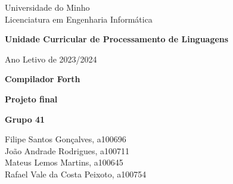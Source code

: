 \documentclass{article}
\begin{document}
\begin{titlepage}
    \centering
    
    {\small Universidade do Minho \\
    Licenciatura em Engenharia Informática \par}
    
    \vspace*{\fill} %

    {\huge\bfseries Unidade Curricular de Processamento de Linguagens \par}
    
    \vspace{0.5cm} %
    
    {\normalsize Ano Letivo de 2023/2024 \par}
    
    \vspace{1cm} %
    
    \hrulefill %
    
    \vspace{1cm} %
    
    {\huge\bfseries Compilador Forth \par}
    
    \vspace{0.5cm} %

    
    {\large\bfseries Projeto final \par}

    \vspace{1cm} %
    
    \hrulefill %
    
    \vspace{2cm} %

    {\bfseries Grupo 41 \\}
        {\normalsize Filipe Santos Gonçalves, a100696 \\ João Andrade Rodrigues, a100711 
 \\ Mateus Lemos Martins, a100645 \\ Rafael Vale da Costa Peixoto, a100754 \par}
    
    \vspace*{\fill} %
    
\end{titlepage}
\end{document}
